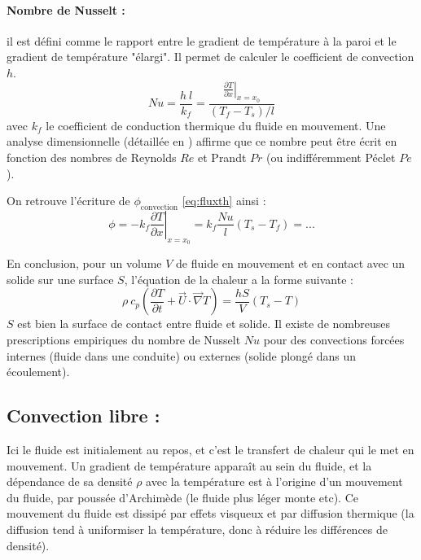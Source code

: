 \paragraph{Nombre de Nusselt :}il est défini comme le rapport entre le gradient de température à la paroi et le gradient de température "élargi". Il permet de calculer le coefficient de convection $h$.
%
\begin{equation}
Nu = \frac{h~l}{k_f}
= \frac{\left. \frac{\partial{T}}{\partial{x}} \right|_{x=x_0}}
{ \left( T_f - T_s \right)/l}
\end{equation}
%
avec $k_f$ le coefficient de conduction thermique du fluide en mouvement. Une analyse dimensionnelle (détaillée en \cite{battaglia2010introduction}) affirme que ce nombre peut être écrit en fonction des nombres de Reynolds $Re$ et Prandt $Pr$ (ou indifféremment Péclet $Pe$).

On retrouve l'écriture de $\phi_{\text{convection}}$ \eqref{eq:fluxth} ainsi :
%
\begin{equation}
\phi = - k_f \left. \frac{\partial{T}}{\partial{x}} \right|_{x=x_0}
     = k_f \frac{Nu}{l} \left( T_s - T_f \right)
     = ...
\end{equation}

En conclusion, pour un volume $V$ de fluide en mouvement et en contact avec un solide sur une surface $S$, l'équation de la chaleur a la forme suivante :
%
\begin{equation}
\rho~c_p \left( \frac{\partial T}{\partial t}
+ \vec{U} \cdot \vec{\nabla} T \right)
= \frac{h S}{V} \left( T_s - T \right)
\end{equation}
%
$S$ est bien la surface de contact entre fluide et solide. Il existe de nombreuses prescriptions empiriques du nombre de Nusselt $Nu$ pour des convections forcées internes (fluide dans une conduite) ou externes (solide plongé dans un écoulement).


\subsection{Convection libre :}
Ici le fluide est initialement au repos, et c'est le transfert de chaleur qui le met en mouvement. Un gradient de température apparaît au sein du fluide, et la dépendance de sa densité $\rho$ avec la température est à l'origine d'un mouvement du fluide, par poussée d'Archimède (le fluide plus léger monte etc). Ce mouvement du fluide est dissipé par effets visqueux et par diffusion thermique (la diffusion tend à uniformiser la température, donc à réduire les différences de densité).

